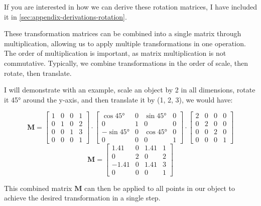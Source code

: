 \documentclass[12pt]{article}
\begin{document}
If you are interested in how we can derive these rotation matrices, I have included it in \autoref{sec:appendix-derivations-rotation}.

These transformation matrices can be combined into a single matrix through multiplication, allowing us to apply multiple transformations in one operation. The order of multiplication is important, as matrix multiplication is not commutative. Typically, we combine transformations in the order of scale, then rotate, then translate.

I will demonstrate with an example, scale an object by 2 in all dimensions, rotate it 45° around the y-axis, and then translate it by (1, 2, 3), we would have:

\[
    \mathbf{M} =
    \begin{bmatrix}
        1 & 0 & 0 & 1 \\
        0 & 1 & 0 & 2 \\
        0 & 0 & 1 & 3 \\
        0 & 0 & 0 & 1
    \end{bmatrix} \cdot
    \begin{bmatrix}
        \cos 45°  & 0 & \sin 45° & 0 \\
        0         & 1 & 0        & 0 \\
        -\sin 45° & 0 & \cos 45° & 0 \\
        0         & 0 & 0        & 1
    \end{bmatrix} \cdot
    \begin{bmatrix}
        2 & 0 & 0 & 0 \\
        0 & 2 & 0 & 0 \\
        0 & 0 & 2 & 0 \\
        0 & 0 & 0 & 1
    \end{bmatrix}
\]
\[
    \mathbf{M} = \begin{bmatrix}
        1.41  & 0 & 1.41 & 1 \\
        0     & 2 & 0    & 2 \\
        -1.41 & 0 & 1.41 & 3 \\
        0     & 0 & 0    & 1
    \end{bmatrix}
\]

This combined matrix $\mathbf{M}$ can then be applied to all points in our object to achieve the desired transformation in a single step.
\end{document}
